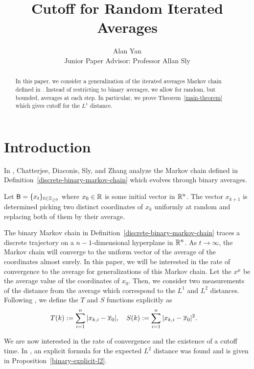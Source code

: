 \documentclass[12pt]{article}
\title{Cutoff for Random Iterated Averages}
\author{Alan Yan \\ Junior Paper Advisor: Professor Allan Sly}
\begin{document}
\maketitle

\begin{abstract}
	In this paper, we consider a generalization of the iterated averages Markov chain defined in \cite{chatterjee2021phase}. Instead of restricting to binary averages, we allow for random, but bounded, averages at each step. In particular, we prove Theorem~\ref{main-theorem} which gives cutoff for the $L^1$ distance.  
\end{abstract}
\tableofcontents

\newpage 

\section{Introduction}

In \cite{chatterjee2021phase}, Chatterjee, Diaconis, Sly, and Zhang analyze the Markov chain defined in Definition~\ref{discrete-binary-markov-chain} which evolves through binary averages.  
\begin{defn} \label{discrete-binary-markov-chain}
	Let $\mathsf{B} = \{x_t\}_{t \in \mathbb{Z}_{\geq 0}}$ where $x_0 \in \mathbb{R}$ is some initial vector in $\mathbb{R}^n$. The vector $x_{k+1}$ is determined picking two distinct coordinates of $x_k$ uniformly at random and replacing both of them by their average. 
\end{defn}

The binary Markov chain in Definition~\ref{discrete-binary-markov-chain} traces a discrete trajectory on a $n-1$-dimensional hyperplane in $\mathbb{R}^n$. As $t \to \infty$, the Markov chain will converge to the uniform vector of the average of the coordinates almost surely. In this paper, we will be interested in the rate of convergence to the average for generalizations of this Markov chain. Let the $x^\mu$ be the average value of the coordinates of $x_0$. Then, we consider two measurements of the distance from the average which correspond to the $L^1$ and $L^2$ distances. Following \cite{chatterjee2021phase}, we define the $T$ and $S$ functions explicitly as 
\begin{align*}
	T(k) & := \sum_{i = 1}^n |x_{k, i} - \overline{x}_0|, \quad S(k) := \sum_{i = 1}^n |x_{k, i} - \overline{x}_0|^2.
\end{align*}

We are now interested in the rate of convergence and the existence of a cutoff time. In \cite{chatterjee2021phase}, an explicit formula for the expected $L^2$ distance was found and is given in Proposition~\ref{binary-explicit-l2}.
\end{document}
